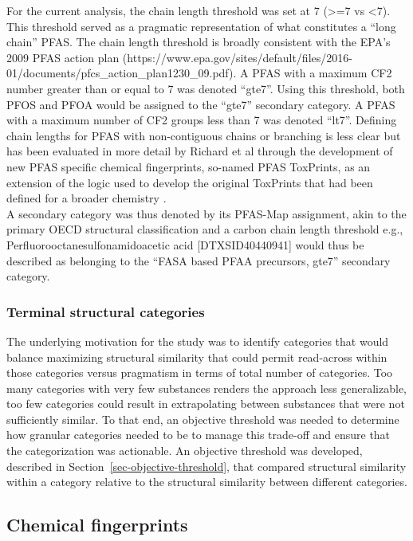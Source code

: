 \documentclass[
  super,
  preprint,
  3p]{elsarticle}
\begin{document}
For the current analysis, the chain length threshold was set at 7
(\textgreater=7 vs \textless7). This threshold served as a pragmatic
representation of what constitutes a ``long chain'' PFAS. The chain
length threshold is broadly consistent with the EPA's 2009 PFAS action
plan
(https://www.epa.gov/sites/default/files/2016-01/documents/pfcs\_action\_plan1230\_09.pdf).
A PFAS with a maximum CF2 number greater than or equal to 7 was denoted
``gte7''. Using this threshold, both PFOS and PFOA would be assigned to
the ``gte7'' secondary category. A PFAS with a maximum number of CF2
groups less than 7 was denoted ``lt7''. Defining chain lengths for PFAS
with non-contiguous chains or branching is less clear but has been
evaluated in more detail by Richard et al
\citep{richard_identification_2022, richard_new_2023} through the
development of new PFAS specific chemical fingerprints, so-named PFAS
ToxPrints, as an extension of the logic used to develop the original
ToxPrints that had been defined for a broader chemistry
\citep{yang_new_2015}.\\
A secondary category was thus denoted by its PFAS-Map assignment, akin
to the primary OECD structural classification and a carbon chain length
threshold e.g., Perfluorooctanesulfonamidoacetic acid
{[}DTXSID40440941{]} would thus be described as belonging to the ``FASA
based PFAA precursors, gte7'' secondary category.

\hypertarget{sec-term-cat}{%
\subsubsection{Terminal structural categories}\label{sec-term-cat}}

The underlying motivation for the study was to identify categories that
would balance maximizing structural similarity that could permit
read-across within those categories versus pragmatism in terms of total
number of categories. Too many categories with very few substances
renders the approach less generalizable, too few categories could result
in extrapolating between substances that were not sufficiently similar.
To that end, an objective threshold was needed to determine how granular
categories needed to be to manage this trade-off and ensure that the
categorization was actionable. An objective threshold was developed,
described in Section~\ref{sec-objective-threshold}, that compared
structural similarity within a category relative to the structural
similarity between different categories.

\hypertarget{sec-fingerprints}{%
\subsection{Chemical fingerprints}\label{sec-fingerprints}}
\end{document}
